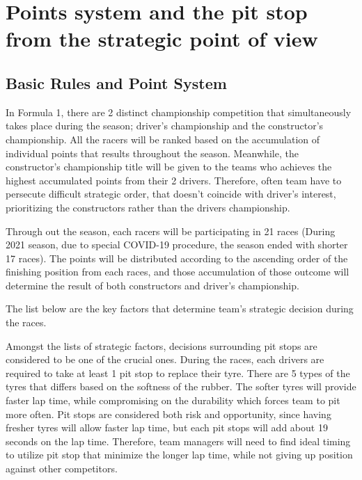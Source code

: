 


\section{Points system and the pit stop from the strategic point of view}

\subsection{Basic Rules and Point System}

In Formula 1, there are 2 distinct championship competition that simultaneously takes
place during the season; driver's championship and the constructor's championship. All
the racers will be ranked based on the accumulation of individual points that results
throughout the season. Meanwhile, the constructor's championship title will be given to
the teams who achieves the highest accumulated points from their 2 drivers. Therefore,
often team have to persecute difficult strategic order, that doesn't coincide with
driver's interest, prioritizing the constructors rather than the drivers championship.

Through out the season, each racers will be participating in 21 races (During 2021
season, due to special COVID-19 procedure, the season ended with shorter 17 races). The
points will be distributed according to the ascending order of the finishing position
from each races, and those accumulation of those outcome will determine the result of
both constructors and driver's championship. 



The list below are the key factors that determine team's strategic decision during the
races.

Amongst the lists of strategic factors, decisions surrounding pit stops are considered
to be one of the crucial ones. During the races, each drivers are required to take at
least 1 pit stop to replace their tyre. There are 5 types of the tyres that differs based
on the softness of the rubber. The softer tyres will provide faster lap time, while
compromising on the durability which forces team to pit more often. Pit stops are
considered both risk and opportunity, since having fresher tyres will allow faster lap
time, but each pit stops will add about 19 seconds on the lap time. Therefore, team
managers will need to find ideal timing to utilize pit stop that minimize the longer lap
time, while not giving up position against other competitors.

